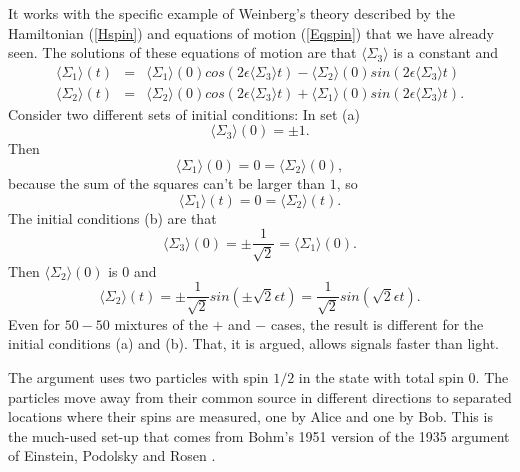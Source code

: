 \documentclass[pra, 12pt, showkeys, eqsecnum]{revtex4}
\begin{document}
It works with the specific example of Weinberg's theory described by the Hamiltonian (\ref{Hspin}) and equations of motion (\ref{Eqspin}) that we have already seen. The solutions of these equations of motion are that $\langle \Sigma_3 \rangle $ is a constant and
\begin{eqnarray}
\langle \Sigma_1 \rangle (t) & = & \langle \Sigma_1 \rangle (0) 
cos(2\epsilon \langle \Sigma_3 \rangle t) - \langle \Sigma_2 \rangle (0) sin(2\epsilon \langle \Sigma_3 \rangle t) \nonumber \\
\langle \Sigma_2 \rangle (t) & = & \langle \Sigma_2 \rangle (0) cos(2\epsilon \langle \Sigma_3 \rangle t)+ \langle \Sigma_1 \rangle (0 )sin(2\epsilon \langle \Sigma_3 \rangle t).
\end{eqnarray}
Consider two different sets of initial conditions: In set (a)
\begin{equation}
\langle \Sigma_3 \rangle (0 ) = \pm 1.
\end{equation} 
Then
\begin{equation}
\langle \Sigma_1 \rangle (0) = 0 =  \langle \Sigma_2 \rangle (0),
\end{equation} 
because the sum of the squares can't be larger than $1$, so
\begin{equation}
\langle \Sigma_1 \rangle (t) = 0 = \langle \Sigma_2 \rangle (t).
\end{equation} 
The initial conditions (b) are that
\begin{equation}
\langle \Sigma_3 \rangle (0 ) = \pm \frac{1}{\sqrt{2}} = \langle \Sigma_1 \rangle (0).
\end{equation} 
Then $\langle \Sigma_2 \rangle (0)$ is $0$ and
\begin{equation}
\langle \Sigma_2 \rangle (t) = \pm \frac{1}{\sqrt{2}}sin(\pm \sqrt{2}\epsilon t) = \frac{1}{\sqrt{2}}sin(\sqrt{2}\epsilon t).
\end{equation} 
Even for $50-50$ mixtures of the $+$ and $-$ cases, the result is different for the initial conditions (a) and (b). That, it is argued, allows signals faster than light.

The argument\cite{GisinExample} uses two particles with spin $1/2$ in the state with total spin $0$. The particles move away from their common source in different directions to separated locations where their spins are measured, one by Alice and one by Bob. This is the much-used set-up that comes from Bohm's 1951 version of the 1935 argument of Einstein, Podolsky and Rosen \cite{Bohm1951,einstein35a}.
\bigskip
\end{document}
